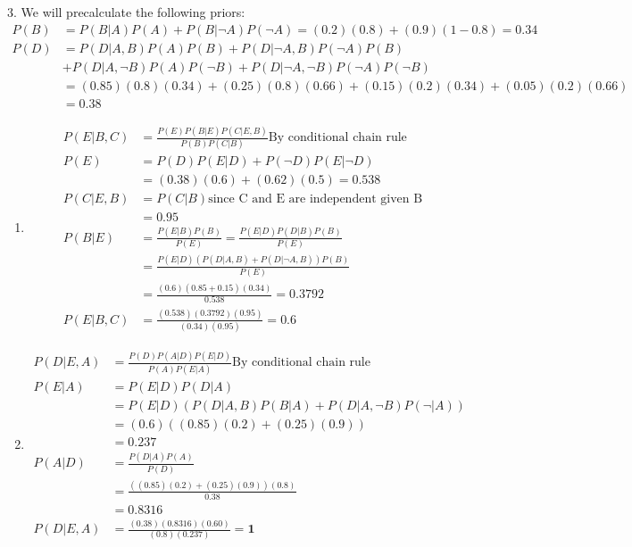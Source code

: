 \documentclass[11pt]{article}
\begin{document}
3. We will precalculate the following priors:
	\begin{align*}
		P(B) &= P(B|A)P(A) + P(B|\lnot A)P(\lnot A) = (0.2)(0.8) + (0.9)(1-0.8) = 0.34\\
		P(D) &= P(D|A,B)P(A)P(B) + P(D|\lnot A,B)P(\lnot A)P(B) \\
				 &+ P(D|A,\lnot B)P(A)P(\lnot B) + P(D|\lnot A,\lnot B)P(\lnot A)P(\lnot B) \\
				 &= (0.85)(0.8)(0.34) + (0.25)(0.8)(0.66) + (0.15)(0.2)(0.34) + (0.05)(0.2)(0.66) \\
				 &= 0.38
	\end{align*}
\begin{enumerate}
	\item
	\begin{align*}
		P(E|B,C) &= \frac{P(E)P(B|E)P(C|E,B)}{P(B)P(C|B)} \text{By conditional chain rule}\\
		P(E) &= P(D)P(E|D) + P(\lnot D)P(E|\lnot D) \\
			&= (0.38)(0.6) + (0.62)(0.5) = 0.538 \\
		P(C|E,B) &= P(C|B) \text{since C and E are independent given B}\\
			&= 0.95 \\
		P(B|E) &= \frac{P(E|B)P(B)}{P(E)} = \frac{P(E|D)P(D|B)P(B)}{P(E)} \\
			&= \frac{P(E|D)(P(D|A,B) + P(D|\lnot A,B))P(B)}{P(E)} \\
			&= \frac{(0.6)(0.85 + 0.15)(0.34)}{0.538} = 0.3792 \\
		P(E|B,C) &= \frac{(0.538)(0.3792)(0.95)}{(0.34)(0.95)} = \mathbf{0.6}
	\end{align*}
	
	\item
	\begin{align*}
		P(D|E,A) &= \frac{ P(D) P(A|D) P(E|D) }{ P(A) P(E|A)} \text{By conditional chain rule} \\
		P(E|A) &= P(E|D)P(D|A) \\
				&= P(E|D)(P(D|A,B)P(B|A) + P(D|A,\lnot B)P(\lnot|A)) \\
				&= (0.6)((0.85)(0.2) + (0.25)(0.9)) \\
				&= 0.237\\
		P(A|D) &= \frac{P(D|A)P(A)}{P(D)} \\
				&= \frac{ ((0.85)(0.2) + (0.25)(0.9))(0.8) }{0.38} \\
				&= 0.8316\\
		P(D|E,A) &= \frac{(0.38)(0.8316)(0.60)}{(0.8)(0.237)} = \mathbf{1}
	\end{align*}
\end{enumerate}
\end{document}
